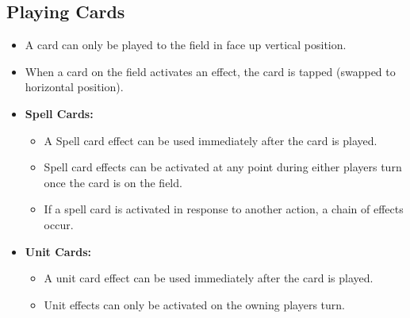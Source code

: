 \subsection{Playing Cards}
\begin{itemize}
    \item A card can only be played to the field in face up vertical position.
    \item When a card on the field activates an effect, the card is tapped (swapped to horizontal position).
    \item \textbf{Spell Cards:}
    \begin{itemize}
        \item A Spell card effect can be used immediately after the card is played.
        \item Spell card effects can be activated at any point during either players turn once the card is on the field.
        \item If a spell card is activated in response to another action, a chain of effects occur.
    \end{itemize}
    \item \textbf{Unit Cards:}
    \begin{itemize}
        \item A unit card effect can be used immediately after the card is played.
        \item Unit effects can only be activated on the owning players turn.
    \end{itemize}
\end{itemize}






